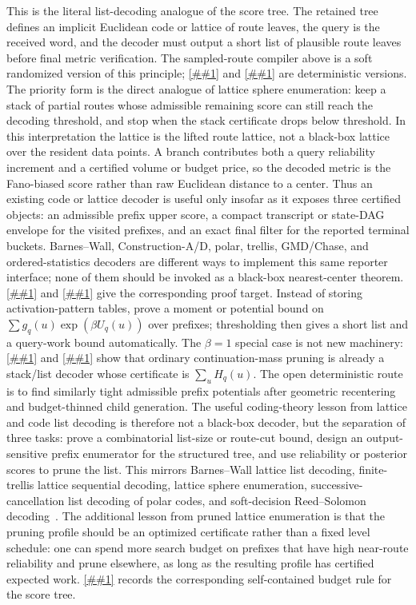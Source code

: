\documentclass[10pt]{article}
\newcommand{\cref}[1]{\ref{##1}}
\newcommand{\Cref}[1]{\ref{##1}}
\theoremstyle{definition}
\begin{document}
This is the literal list-decoding analogue of the score tree.  The retained
tree defines an implicit Euclidean code or lattice of route leaves, the query is
the received word, and the decoder must output a short list of plausible route
leaves before final metric verification.  The sampled-route compiler above is a
soft randomized version of this principle; \cref{lem:prefix-list-decoder} and
\cref{lem:priority-prefix-list-decoder} are deterministic versions.  The
priority form is the direct analogue of lattice sphere enumeration: keep a
stack of partial routes whose admissible remaining score can still reach the
decoding threshold, and stop when the stack certificate drops below threshold.
In this interpretation the lattice is the lifted route lattice, not a
black-box lattice over the resident data points.  A branch contributes both a
query reliability increment and a certified volume or budget price, so the
decoded metric is the Fano-biased score rather than raw Euclidean distance to a
center.  Thus an existing code or lattice decoder is useful only insofar as it
exposes three certified objects: an admissible prefix upper score, a compact
transcript or state-DAG envelope for the visited prefixes, and an exact final
filter for the reported terminal buckets.  Barnes--Wall, Construction-A/D,
polar, trellis, GMD/Chase, and ordered-statistics decoders are different ways
to implement this same reporter interface; none of them should be invoked as a
black-box nearest-center theorem.
\Cref{lem:exponential-list-size} and \cref{cor:prefix-list-resources} give the
corresponding proof target.  Instead of storing activation-pattern tables, prove
a moment or potential bound on \(\sum g_q(u)\exp(\beta U_q(u))\) over prefixes;
thresholding then gives a short list and a query-work bound automatically.  The
\(\beta=1\) special case is not new machinery:
\cref{lem:continuation-list-certificate} and
\cref{cor:continuation-as-list-decoding} show that ordinary continuation-mass
pruning is already a stack/list decoder whose certificate is
\(\sum_u H_q(u)\).  The open deterministic route is to find similarly tight
admissible prefix potentials after geometric recentering and budget-thinned
child generation.  The useful coding-theory lesson from lattice and code list
decoding is therefore not a black-box decoder, but the separation of three
tasks: prove a
combinatorial list-size or route-cut bound, design an output-sensitive prefix
enumerator for the structured tree, and use reliability or posterior scores to
prune the list.  This mirrors Barnes--Wall lattice list decoding,
finite-trellis lattice sequential decoding, lattice sphere enumeration,
successive-cancellation list decoding of polar codes, and soft-decision
Reed--Solomon decoding~\cite{GP17,MP20,TVZ97,FP85,SE94,GNR10,TV12,KV03}.
The additional lesson from pruned lattice enumeration is that the pruning
profile should be an optimized certificate rather than a fixed level schedule:
one can spend more search budget on prefixes that have high near-route
reliability and prune elsewhere, as long as the resulting profile has certified
expected work.  \Cref{lem:pruned-budget-thinning} records the corresponding
self-contained budget rule for the score tree.
\end{document}
